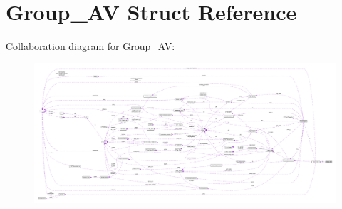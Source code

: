 \hypertarget{struct_group___a_v}{\section{Group\+\_\+\+A\+V Struct Reference}
\label{struct_group___a_v}
}


Collaboration diagram for Group\+\_\+\+A\+V\+:
\nopagebreak
\begin{figure}[H]
\begin{center}
\leavevmode
\includegraphics[width=350pt]{struct_group___a_v__coll__graph}
\end{center}
\end{figure}
